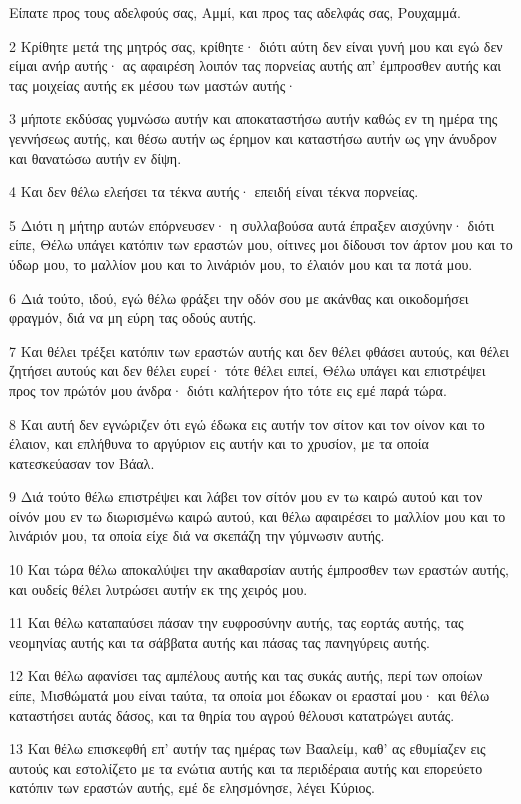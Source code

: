 \par Είπατε προς τους αδελφούς σας, Αμμί, και προς τας αδελφάς σας, Ρουχαμμά.
\par 2 Κρίθητε μετά της μητρός σας, κρίθητε· διότι αύτη δεν είναι γυνή μου και εγώ δεν είμαι ανήρ αυτής· ας αφαιρέση λοιπόν τας πορνείας αυτής απ' έμπροσθεν αυτής και τας μοιχείας αυτής εκ μέσου των μαστών αυτής·
\par 3 μήποτε εκδύσας γυμνώσω αυτήν και αποκαταστήσω αυτήν καθώς εν τη ημέρα της γεννήσεως αυτής, και θέσω αυτήν ως έρημον και καταστήσω αυτήν ως γην άνυδρον και θανατώσω αυτήν εν δίψη.
\par 4 Και δεν θέλω ελεήσει τα τέκνα αυτής· επειδή είναι τέκνα πορνείας.
\par 5 Διότι η μήτηρ αυτών επόρνευσεν· η συλλαβούσα αυτά έπραξεν αισχύνην· διότι είπε, Θέλω υπάγει κατόπιν των εραστών μου, οίτινες μοι δίδουσι τον άρτον μου και το ύδωρ μου, το μαλλίον μου και το λινάριόν μου, το έλαιόν μου και τα ποτά μου.
\par 6 Διά τούτο, ιδού, εγώ θέλω φράξει την οδόν σου με ακάνθας και οικοδομήσει φραγμόν, διά να μη εύρη τας οδούς αυτής.
\par 7 Και θέλει τρέξει κατόπιν των εραστών αυτής και δεν θέλει φθάσει αυτούς, και θέλει ζητήσει αυτούς και δεν θέλει ευρεί· τότε θέλει ειπεί, Θέλω υπάγει και επιστρέψει προς τον πρώτόν μου άνδρα· διότι καλήτερον ήτο τότε εις εμέ παρά τώρα.
\par 8 Και αυτή δεν εγνώριζεν ότι εγώ έδωκα εις αυτήν τον σίτον και τον οίνον και το έλαιον, και επλήθυνα το αργύριον εις αυτήν και το χρυσίον, με τα οποία κατεσκεύασαν τον Βάαλ.
\par 9 Διά τούτο θέλω επιστρέψει και λάβει τον σίτόν μου εν τω καιρώ αυτού και τον οίνόν μου εν τω διωρισμένω καιρώ αυτού, και θέλω αφαιρέσει το μαλλίον μου και το λινάριόν μου, τα οποία είχε διά να σκεπάζη την γύμνωσιν αυτής.
\par 10 Και τώρα θέλω αποκαλύψει την ακαθαρσίαν αυτής έμπροσθεν των εραστών αυτής, και ουδείς θέλει λυτρώσει αυτήν εκ της χειρός μου.
\par 11 Και θέλω καταπαύσει πάσαν την ευφροσύνην αυτής, τας εορτάς αυτής, τας νεομηνίας αυτής και τα σάββατα αυτής και πάσας τας πανηγύρεις αυτής.
\par 12 Και θέλω αφανίσει τας αμπέλους αυτής και τας συκάς αυτής, περί των οποίων είπε, Μισθώματά μου είναι ταύτα, τα οποία μοι έδωκαν οι ερασταί μου· και θέλω καταστήσει αυτάς δάσος, και τα θηρία του αγρού θέλουσι κατατρώγει αυτάς.
\par 13 Και θέλω επισκεφθή επ' αυτήν τας ημέρας των Βααλείμ, καθ' ας εθυμίαζεν εις αυτούς και εστολίζετο με τα ενώτια αυτής και τα περιδέραια αυτής και επορεύετο κατόπιν των εραστών αυτής, εμέ δε ελησμόνησε, λέγει Κύριος.

